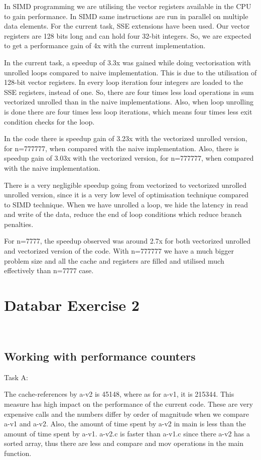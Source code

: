 \documentclass[acmlarge,screen,nonacm]{acmart}
\begin{document}
In SIMD programming we are utilising the vector registers available in the CPU to gain performance.
In SIMD same instructions are run in parallel on multiple data elements. For the current task, SSE  extensions have been used. Our vector registers are 128 bits long and can hold four 32-bit integers. So, we are expected to get a performance gain of 4x with the current implementation. \

In the current task, a speedup of 3.3x was gained while doing vectorisation with unrolled loops compared to naive implementation. This is due to the utilisation of 128-bit vector registers. In every loop iteration four integers are loaded to the SSE registers, instead of one. So, there are four times less load operations in sum vectorized unrolled than in the naive implementations. Also, when loop unrolling is done there are four times less loop iterations, which means four times less exit condition checks for the loop. \

In the code there is speedup gain of 3.23x with the vectorized unrolled version, for n=777777, when compared with the naive implementation. Also, there is speedup gain of 3.03x with the vectorized version, for n=777777, when compared with the naive implementation. \

There is a very negligible speedup going from vectorized to vectorized unrolled unrolled version, since it is a very low level of optimisation technique compared to SIMD technique. When we have unrolled a loop, we hide the latency in read and write of the data, reduce the end of loop conditions which reduce branch penalties. \

For n=7777, the speedup observed was around 2.7x for both vectorized unrolled and vectorized version of the code. With n=777777 we have a much bigger problem size and all the cache and registers are filled and utilised much effectively than n=7777 case.


\section{Databar Exercise 2} \

\subsection{Working with performance counters}

Task A:

The cache-references by a-v2 is 45148, where as for a-v1, it is 215344. This measure has high impact on the performance of the current code. These are very expensive calls and the numbers differ by order of magnitude when we compare a-v1 and a-v2. Also, the amount of time spent by a-v2 in main is less than the amount of time spent by a-v1. a-v2.c is faster than a-v1.c since there a-v2 has a sorted array, thus there are less and compare and mov operations in the main function. 
\end{document}
